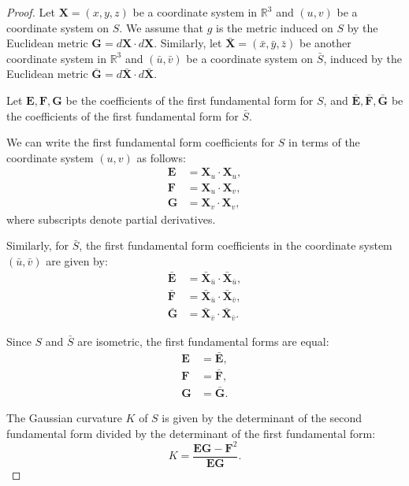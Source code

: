 \documentclass{article}
\theoremstyle{definition}
\numberwithin{equation}{section}
\begin{document}
\begin{proof}
Let $\mathbf{X} = (x, y, z)$ be a coordinate system in $\mathbb{R}^3$ and $(u, v)$ be a coordinate system on $S$. We assume that $g$ is the metric induced on $S$ by the Euclidean metric $\mathbf{G} = d\mathbf{X} \cdot d\mathbf{X}$. Similarly, let $\bar{\mathbf{X}} = (\bar{x}, \bar{y}, \bar{z})$ be another coordinate system in $\mathbb{R}^3$ and $(\bar{u}, \bar{v})$ be a coordinate system on $\bar{S}$, induced by the Euclidean metric $\bar{\mathbf{G}} = d\bar{\mathbf{X}} \cdot d\bar{\mathbf{X}}$.

Let $\mathbf{E}, \mathbf{F}, \mathbf{G}$ be the coefficients of the first fundamental form for $S$, and $\bar{\mathbf{E}}, \bar{\mathbf{F}}, \bar{\mathbf{G}}$ be the coefficients of the first fundamental form for $\bar{S}$.

We can write the first fundamental form coefficients for $S$ in terms of the coordinate system $(u, v)$ as follows:
\begin{align*}
\mathbf{E} &= \mathbf{X}_u \cdot \mathbf{X}_u, \\
\mathbf{F} &= \mathbf{X}_u \cdot \mathbf{X}_v, \\
\mathbf{G} &= \mathbf{X}_v \cdot \mathbf{X}_v,
\end{align*}
where subscripts denote partial derivatives.

Similarly, for $\bar{S}$, the first fundamental form coefficients in the coordinate system $(\bar{u}, \bar{v})$ are given by:
\begin{align*}
\bar{\mathbf{E}} &= \bar{\mathbf{X}}_{\bar{u}} \cdot \bar{\mathbf{X}}_{\bar{u}}, \\
\bar{\mathbf{F}} &= \bar{\mathbf{X}}_{\bar{u}} \cdot \bar{\mathbf{X}}_{\bar{v}}, \\
\bar{\mathbf{G}} &= \bar{\mathbf{X}}_{\bar{v}} \cdot \bar{\mathbf{X}}_{\bar{v}}.
\end{align*}

Since $S$ and $\bar{S}$ are isometric, the first fundamental forms are equal:
\begin{align}
\mathbf{E} &= \bar{\mathbf{E}}, \label{eq:egregium_1} \\
\mathbf{F} &= \bar{\mathbf{F}}, \label{eq:egregium_2} \\
\mathbf{G} &= \bar{\mathbf{G}}. \label{eq:egregium_3}
\end{align}

The Gaussian curvature $K$ of $S$ is given by the determinant of the second fundamental form divided by the determinant of the first fundamental form:
\begin{equation}\label{eq:egregium_K}
K = \frac{\mathbf{EG} - \mathbf{F}^2}{\mathbf{EG}}.
\end{equation}


\end{proof}
\end{document}
